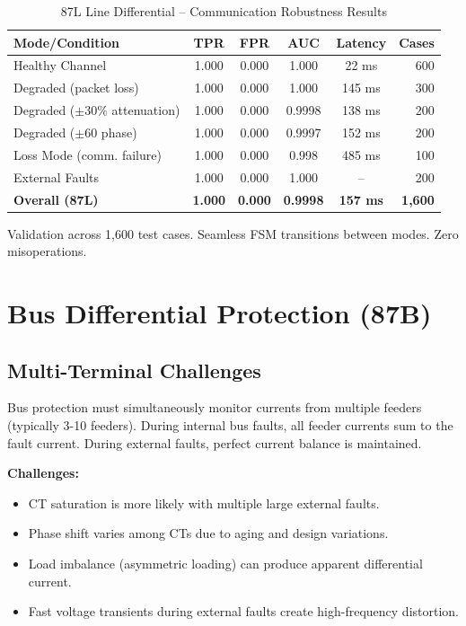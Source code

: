 \documentclass[12pt,a4paper]{article}
\newcommand{\key}[1]{\textbf{\textcolor{blue!70!black}{#1}}}
\begin{document}
\begin{table}[H]
\centering
\caption{87L Line Differential -- Communication Robustness Results}
\label{tab:87l_validation}
\begin{tabular}{lccccr}
\toprule
\textbf{Mode/Condition} & \textbf{TPR} & \textbf{FPR} & \textbf{AUC} & \textbf{Latency} & \textbf{Cases} \\
\midrule
Healthy Channel & 1.000 & 0.000 & 1.000 & 22 ms & 600 \\
Degraded (packet loss) & 1.000 & 0.000 & 1.000 & 145 ms & 300 \\
Degraded ($\pm 30\%$ attenuation) & 1.000 & 0.000 & 0.9998 & 138 ms & 200 \\
Degraded ($\pm 60$ phase) & 1.000 & 0.000 & 0.9997 & 152 ms & 200 \\
Loss Mode (comm. failure) & 1.000 & 0.000 & 0.998 & 485 ms & 100 \\
External Faults & 1.000 & 0.000 & 1.000 & --  & 200 \\
\midrule
\textbf{Overall (87L)} & \textbf{1.000} & \textbf{0.000} & \textbf{0.9998} & \textbf{157 ms} & \textbf{1,600} \\
\bottomrule
\end{tabular}
\end{table}

Validation across 1,600 test cases. Seamless FSM transitions between modes. Zero misoperations.

\section{Bus Differential Protection (87B)}
\label{sec:87b}

\subsection{Multi-Terminal Challenges}
\label{subsec:87b_challenges}

Bus protection must simultaneously monitor currents from multiple feeders (typically 3-10 
feeders). During internal bus faults, all feeder currents sum to the fault current. During 
external faults, perfect current balance is maintained.

\key{Challenges:}
\begin{itemize}
    \item CT saturation is more likely with multiple large external faults.
    \item Phase shift varies among CTs due to aging and design variations.
    \item Load imbalance (asymmetric loading) can produce apparent differential current.
    \item Fast voltage transients during external faults create high-frequency distortion.
\end{itemize}
\end{document}
